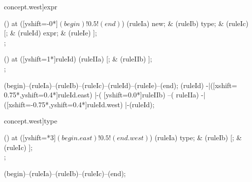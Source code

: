 \begin{syntax}[[xshift=24mm]concept.west]{expr}
  
  \node[sequence,column sep=1.5cm] () at ([yshift=-0*\syntaxruledist]$(begin)!0.5!(end)$) {
    \node[terminal]       (ruleIa) {new};
    &
    \node[nonterminal]    (ruleIb) {type};
    &
    \node[terminal]       (ruleIc) {[};
    &
    \node[nonterminal]    (ruleId) {expr};
    &
    \node[terminal]       (ruleIe) {]};
    \\
  };
  
  \node[sequence,column sep=1.0cm] () at ([yshift=1*\syntaxruledist]ruleId) {
    \node[terminal]    (ruleIIa) {[};
    &
    \node[terminal]    (ruleIIb) {]};
    \\
  };
  
  \draw[path] (begin)--(ruleIa)--(ruleIb)--(ruleIc)--(ruleId)--(ruleIe)--(end);
  \draw[path] (ruleId)
            -|([xshift= 0.75*\syntaxruledist,yshift=0.4*\syntaxruledist]ruleId.east)
            |-(                            [yshift=0.0*\syntaxruledist]ruleIIb)
            --(                                                        ruleIIa)
            -|([xshift=-0.75*\syntaxruledist,yshift=0.4*\syntaxruledist]ruleId.west)
            |-(ruleId);
\end{syntax}

\begin{syntax}[[xshift=22mm]concept.west]{type}
  
  \node[sequence,anchor=north,column sep=1.5cm] () at ([yshift=\syntaxrulenodeheight-0.8pt*3]$(begin.east)!0.5!(end.west)$) {
    \node[nonterminal] (ruleIa) {type};
    &
    \node[terminal]    (ruleIb) {[};
    &
    \node[terminal]    (ruleIc) {]};
    \\
  };
  
  \draw[path] (begin)--(ruleIa)--(ruleIb)--(ruleIc)--(end);
\end{syntax}

